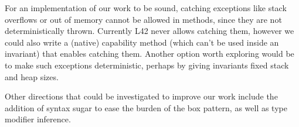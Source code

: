 


For an implementation of our work to be sound, catching exceptions like stack overflows or out of memory
cannot be allowed in \Q@invariant@ methods, since they are not deterministically thrown.
Currently L42 never allows catching them, however we could also write a (native) capability method (which can't be used inside an invariant) that enables catching them. Another option worth exploring would be to make such exceptions deterministic, perhaps by giving invariants fixed stack and heap sizes.

Other directions that could be investigated to improve our work include the addition of syntax sugar to ease the burden of the box pattern, as well as type modifier inference.


